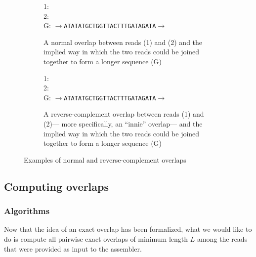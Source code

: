 \documentclass[10pt]{article}
\begin{document}
\begin{figure}
	\centering
	\begin{subfigure}[t]{0.455\textwidth}
		1:  \\
		2:  \\
		G: {\tt $\rightarrow$ATATATGCTGGTTACTTTGATAGATA$\rightarrow$}
		\caption{A normal overlap between reads (1) and (2) and the
		implied way in which the two reads could be joined together to
		form a longer sequence (G)}
	\end{subfigure}
		\hspace{0.07\textwidth}
	\begin{subfigure}[t]{0.455\textwidth}
		1:  \\
		2:  \\
		G: {\tt $\rightarrow$ATATATGCTGGTTACTTTGATAGATA$\rightarrow$}
		\caption{A reverse-complement overlap between reads (1) and
		(2)--- more specifically, an ``innie'' overlap--- and the
		implied way in which the two reads could be joined together to
		form a longer sequence (G)}
	\end{subfigure}
	\caption{Examples of normal and reverse-complement overlaps}
	\label{fig:overlap_examples}
\end{figure}

\subsection{Computing overlaps}

\subsubsection{Algorithms}

Now that the idea of an exact overlap has been formalized, what we would like to
do is compute all pairwise exact overlaps of minimum length $L$ among the reads
that were provided as input to the assembler.
\end{document}
